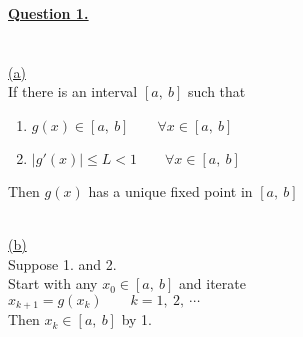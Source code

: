 \documentclass[12pt]{article}
\begin{document}
\noindent \hyperlink{toc}{\LARGE \underline{\textbf{Question 1.}}}\\\\
\noindent ~\\\hyperlink{toc}{\hypertarget{1.1}{(a)}}\\
If there is an interval $[a,\ b]$ such that
\begin{enumerate}
    \item $g(x) \in [a,\ b] \qquad \forall x\in [a,\ b]$
    \item $|g'(x)| \leq L < 1 \qquad \forall x\in [a,\ b]$
\end{enumerate}
Then $g(x)$ has a unique fixed point in $[a,\ b]$

\noindent ~\\\hyperlink{toc}{\hypertarget{1.2}{(b)}}\\
Suppose 1. and 2. \\
Start with any $x_0\in [a,\ b]$ and iterate\\
$x_{k+1} = g(x_k) \qquad k = 1,\ 2,\ \cdots$\\

Then $x_k \in [a,\ b]$ by 1.\\
\end{document}
